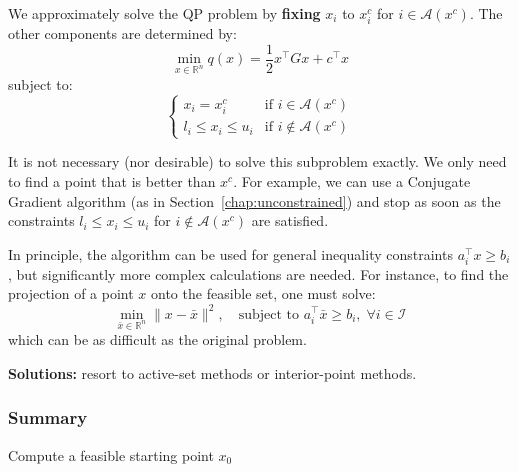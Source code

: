 We approximately solve the QP problem by \textbf{fixing} $x_i$ to $x_i^c$ for $i \in \mathcal{A}(x^c)$.
The other components are determined by:
\begin{equation}
    \min_{x \in \mathbb{R}^n} q(x) = \frac{1}{2} x^\top G x + c^\top x
\end{equation}
subject to:
\begin{equation}
    \begin{cases}
        x_i = x_i^c & \text{if } i \in \mathcal{A}(x^c) \\
        l_i \le x_i \le u_i & \text{if } i \notin \mathcal{A}(x^c)
    \end{cases}
\end{equation}

\begin{remarque}
    It is not necessary (nor desirable) to solve this subproblem exactly. We only need to find a point that is better than $x^c$.
    For example, we can use a Conjugate Gradient algorithm (as in Section~\ref{chap:unconstrained}) and stop as soon as the constraints $l_i \le x_i \le u_i$ for $i \notin \mathcal{A}(x^c)$ are satisfied.
\end{remarque}

\begin{remarque}
    In principle, the algorithm can be used for general inequality constraints $a_i^\top x \ge b_i$, but significantly more complex calculations are needed.
    For instance, to find the projection of a point $x$ onto the feasible set, one must solve:
    \begin{equation}
        \min_{\bar{x} \in \mathbb{R}^n} \|x - \bar{x}\|^2, \quad \text{subject to } a_i^\top \bar{x} \ge b_i, \; \forall i \in \mathcal{I}
    \end{equation}
    which can be as difficult as the original problem.
    
    \textbf{Solutions:} resort to active-set methods or interior-point methods.
\end{remarque}

\subsubsection{Summary}

\begin{algorithm}[H]
    \caption{Projected gradient method for Quadratic Programming}
    \SetAlgoLined
    Compute a feasible starting point $x_0$\;
\end{algorithm}

